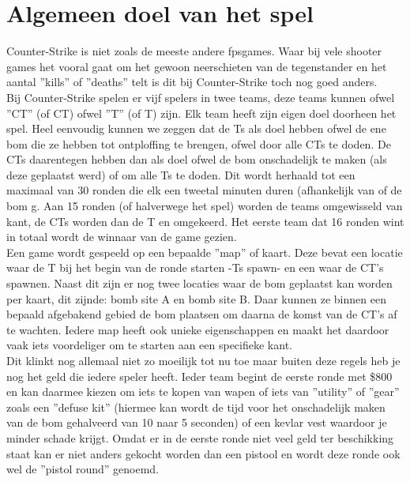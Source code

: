 \documentclass[pdftex,a4paper,12pt,twoside]{report}
\begin{document}
\section{Algemeen doel van het spel}
\label{sec:algemeen doel van het spel}
Counter-Strike is niet zoals de meeste andere \gls{fpsgames}. Waar bij vele shooter games het vooral gaat om het gewoon neerschieten van de tegenstander en het aantal ''kills'' of ''deaths'' telt is dit bij Counter-Strike toch nog goed anders.
\\

Bij Counter-Strike spelen er vijf spelers in twee teams, deze teams kunnen ofwel ''\gls{CT}'' (of CT) ofwel ''\gls{T}'' (of T) zijn. Elk team heeft zijn eigen doel doorheen het spel. Heel eenvoudig kunnen we zeggen dat de \gls{T}s als doel hebben ofwel de ene bom die ze hebben tot ontploffing te brengen, ofwel door alle \gls{CT}s te doden. 
De \gls{CT}s daarentegen hebben dan als doel ofwel de bom onschadelijk te maken (als deze geplaatst werd) of om alle \gls{T}s te doden. Dit wordt herhaald tot een maximaal van 30 ronden die elk een tweetal minuten duren (afhankelijk van of de bom g. Aan 15 ronden (of halverwege het spel) worden de teams omgewisseld van kant, de \gls{CT}s worden dan de \gls{T} en omgekeerd. Het eerste team dat 16 ronden wint in totaal wordt de winnaar van de game gezien.
\\

Een game wordt gespeeld op een bepaalde ''\gls{map}'' of kaart. Deze bevat een locatie waar de \gls{T} bij het begin van de ronde starten -\gls{T}s \gls{spawn}- en een waar de CT's \gls{spawn}en. Naast dit zijn er nog twee locaties waar de bom geplaatst kan worden per kaart, dit zijnde: bomb site A en bomb site B. Daar kunnen ze binnen een bepaald afgebakend gebied de bom plaatsen om daarna de komst van de CT's af te wachten. Iedere \gls{map} heeft ook unieke eigenschappen en maakt het daardoor vaak iets voordeliger om te starten aan een specifieke kant.
\\

Dit klinkt nog allemaal niet zo moeilijk tot nu toe maar buiten deze regels heb je nog het geld die iedere speler heeft. Ieder team begint de eerste ronde met \$800 en kan daarmee kiezen om iets te kopen van wapen of iets van ''utility'' of ''gear'' zoals een ''defuse kit'' (hiermee kan wordt de tijd voor het onschadelijk maken van de bom gehalveerd van 10 naar 5 seconden) of een kevlar vest waardoor je minder schade krijgt. 
Omdat er in de eerste ronde niet veel geld ter beschikking staat kan er niet anders gekocht worden dan een pistool en wordt deze ronde ook wel de ''pistol round'' genoemd.
\\
\end{document}
